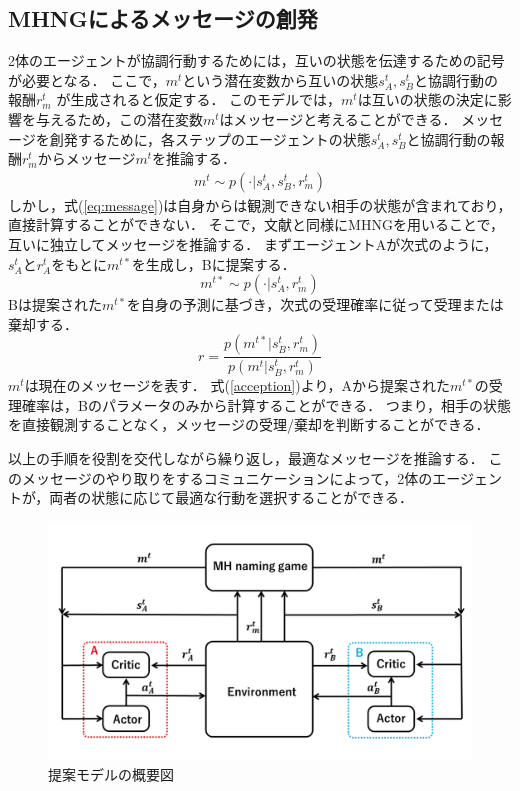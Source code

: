 \documentclass[twocolumn,a4j]{jarticle}
\begin{document}
\subsection{MHNGによるメッセージの創発}
\label{2.1}
2体のエージェントが協調行動するためには，互いの状態を伝達するための記号が必要となる．
ここで，$m^t$という潜在変数から互いの状態$s^t_{A}, s^t_{B}$と協調行動の報酬$r^t_{m}$ が生成されると仮定する．
このモデルでは，$m^t$は互いの状態の決定に影響を与えるため，この潜在変数$m^t$はメッセージと考えることができる．
メッセージを創発するために，各ステップのエージェントの状態$s^t_{A}, s^t_{B}$と協調行動の報酬$r^t_{m} $からメッセージ$m^t$を推論する．
%
\begin{eqnarray}
m^t \sim p(\cdot | s^t_{A}, s^t_{B},  r^t_{m} ) \label{eq:message}
\end{eqnarray} 
%
しかし，式(\ref{eq:message})は自身からは観測できない相手の状態が含まれており，直接計算することができない．
そこで，文献\cite{mh1}と同様にMHNGを用いることで，互いに独立してメッセージを推論する．
まずエージェントAが次式のように，$s^t_A$と$r^t_A$をもとに$m^{t*}$を生成し，Bに提案する．
%
\begin{equation}
m^{t*} \sim p(\cdot | s^t_{A}, r^t_{m}) \label{eq:porpose_prob}
\end{equation}
%
Bは提案された$m^{t*}$を自身の予測に基づき，次式の受理確率に従って受理または棄却する．
%
\begin{equation}
r =  \frac{p(m^{t*}|s^t_{B}, r^t_{m})}{p(m^t|s^t_{B}, r^t_{m})} \label{acception}
\end{equation}
%
$m^t$は現在のメッセージを表す．
式(\ref{acception})より，Aから提案された$m^{t*}$の受理確率は，Bのパラメータのみから計算することができる．
つまり，相手の状態を直接観測することなく，メッセージの受理/棄却を判断することができる．

以上の手順を役割を交代しながら繰り返し，最適なメッセージを推論する．
このメッセージのやり取りをするコミュニケーションによって，2体のエージェントが，両者の状態に応じて最適な行動を選択することができる．

%
\begin{figure}[t]
\centering
\includegraphics[scale=0.23]{fig/model.pdf}
\caption{提案モデルの概要図}
\label{fig:model}
\end{figure}
\end{document}
